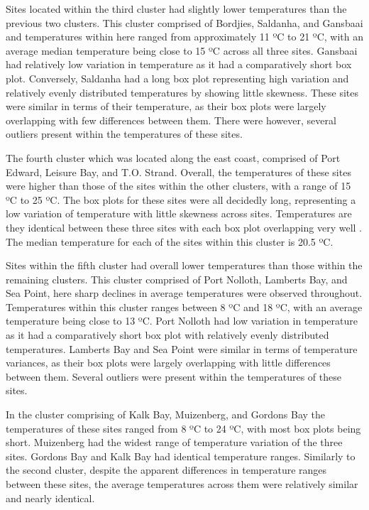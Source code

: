 \documentclass[12pt,A4paper,]{article}
\begin{document}
Sites located within the third cluster had slightly lower temperatures
than the previous two clusters. This cluster comprised of Bordjies,
Saldanha, and Gansbaai and temperatures within here ranged from
approximately 11 ºC to 21 ºC, with an average median temperature being
close to 15 ºC across all three sites. Gansbaai had relatively low
variation in temperature as it had a comparatively short box plot.
Conversely, Saldanha had a long box plot representing high variation and
relatively evenly distributed temperatures by showing little skewness.
These sites were similar in terms of their temperature, as their box
plots were largely overlapping with few differences between them. There
were however, several outliers present within the temperatures of these
sites.

The fourth cluster which was located along the east coast, comprised of
Port Edward, Leisure Bay, and T.O. Strand. Overall, the temperatures of
these sites were higher than those of the sites within the other
clusters, with a range of 15 ºC to 25 ºC. The box plots for these sites
were all decidedly long, representing a low variation of temperature
with little skewness across sites. Temperatures are they identical
between these three sites with each box plot overlapping very well . The
median temperature for each of the sites within this cluster is 20.5 ºC.

Sites within the fifth cluster had overall lower temperatures than those
within the remaining clusters. This cluster comprised of Port Nolloth,
Lamberts Bay, and Sea Point, here sharp declines in average temperatures
were observed throughout. Temperatures within this cluster ranges
between 8 ºC and 18 ºC, with an average temperature being close to 13
ºC. Port Nolloth had low variation in temperature as it had a
comparatively short box plot with relatively evenly distributed
temperatures. Lamberts Bay and Sea Point were similar in terms of
temperature variances, as their box plots were largely overlapping with
little differences between them. Several outliers were present within
the temperatures of these sites.

In the cluster comprising of Kalk Bay, Muizenberg, and Gordons Bay the
temperatures of these sites ranged from 8 ºC to 24 ºC, with most box
plots being short. Muizenberg had the widest range of temperature
variation of the three sites. Gordons Bay and Kalk Bay had identical
temperature ranges. Similarly to the second cluster, despite the
apparent differences in temperature ranges between these sites, the
average temperatures across them were relatively similar and nearly
identical.
\end{document}
